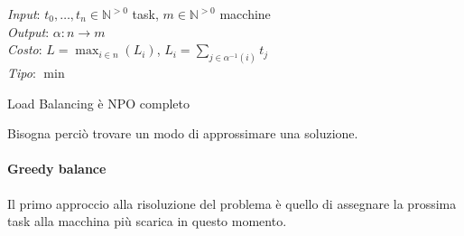 \emph{Input}: $t_0, \dots, t_n \in \mathbb{N}^{>0}$ task, $m \in \mathbb{N}^{>0}$ macchine\\ 
\emph{Output}: $\alpha : n \rightarrow m$ \\
\emph{Costo}: $L = \max_{i \in n}(L_i)$, $L_i = \sum_{j \in \alpha^{-1}(i)}t_j$ \\
\emph{Tipo}: $\min$

\begin{theorem}
    Load Balancing è NPO completo
\end{theorem}
Bisogna perciò trovare un modo di approssimare una soluzione.
\paragraph{Greedy balance}
Il primo approccio alla risoluzione del problema è quello di assegnare la prossima
task alla macchina più scarica in questo momento.

